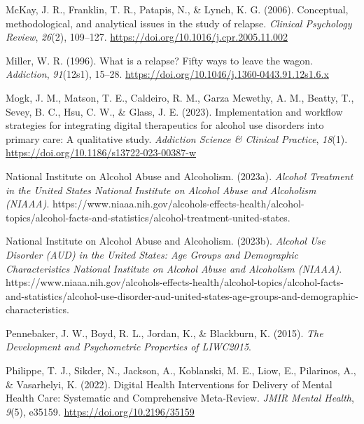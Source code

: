 \documentclass[
  letterpaper,
  DIV=11,
  numbers=noendperiod]{scrartcl}
\newlength{\cslhangindent}
\newenvironment{CSLReferences}[2] %
 {\begin{list}{}{%
  \setlength{\itemindent}{0pt}
  \setlength{\leftmargin}{0pt}
  \setlength{\parsep}{0pt}
  \ifodd #1
   \setlength{\leftmargin}{\cslhangindent}
   \setlength{\itemindent}{-1\cslhangindent}
  \fi
  \setlength{\itemsep}{#2\baselineskip}}}
 {\end{list}}
\begin{document}
\begin{CSLReferences}{1}{0}
McKay, J. R., Franklin, T. R., Patapis, N., \& Lynch, K. G. (2006).
Conceptual, methodological, and analytical issues in the study of
relapse. \emph{Clinical Psychology Review}, \emph{26}(2), 109--127.
\url{https://doi.org/10.1016/j.cpr.2005.11.002}

Miller, W. R. (1996). What is a relapse? {Fifty} ways to leave the
wagon. \emph{Addiction}, \emph{91}(12s1), 15--28.
\url{https://doi.org/10.1046/j.1360-0443.91.12s1.6.x}

Mogk, J. M., Matson, T. E., Caldeiro, R. M., Garza Mcwethy, A. M.,
Beatty, T., Sevey, B. C., Hsu, C. W., \& Glass, J. E. (2023).
Implementation and workflow strategies for integrating digital
therapeutics for alcohol use disorders into primary care: {A}
qualitative study. \emph{Addiction Science \& Clinical Practice},
\emph{18}(1). \url{https://doi.org/10.1186/s13722-023-00387-w}

National Institute on Alcohol Abuse and Alcoholism. (2023a).
\emph{Alcohol {Treatment} in the {United States} {\textbar} {National
Institute} on {Alcohol Abuse} and {Alcoholism} ({NIAAA})}.
https://www.niaaa.nih.gov/alcohols-effects-health/alcohol-topics/alcohol-facts-and-statistics/alcohol-treatment-united-states.

National Institute on Alcohol Abuse and Alcoholism. (2023b).
\emph{Alcohol {Use Disorder} ({AUD}) in the {United States}: {Age
Groups} and {Demographic Characteristics} {\textbar} {National
Institute} on {Alcohol Abuse} and {Alcoholism} ({NIAAA})}.
https://www.niaaa.nih.gov/alcohols-effects-health/alcohol-topics/alcohol-facts-and-statistics/alcohol-use-disorder-aud-united-states-age-groups-and-demographic-characteristics.

Pennebaker, J. W., Boyd, R. L., Jordan, K., \& Blackburn, K. (2015).
\emph{The {Development} and {Psychometric Properties} of {LIWC2015}}.

Philippe, T. J., Sikder, N., Jackson, A., Koblanski, M. E., Liow, E.,
Pilarinos, A., \& Vasarhelyi, K. (2022). Digital {Health Interventions}
for {Delivery} of {Mental Health Care}: {Systematic} and {Comprehensive
Meta-Review}. \emph{JMIR Mental Health}, \emph{9}(5), e35159.
\url{https://doi.org/10.2196/35159}


\end{CSLReferences}
\end{document}
